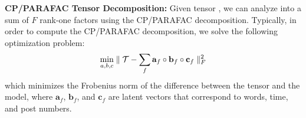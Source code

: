 

\textbf{CP/PARAFAC Tensor Decomposition:}
Given tensor \tensor, we can analyze into a sum of $F$ rank-one factors  using the CP/PARAFAC decomposition.
Typically, in order to compute the CP/PARAFAC decomposition, we solve the following optimization problem:
\[ \footnotesize
\min\limits_{a, b, c}  \parallel {\ensuremath{\mathbf{\mathcal{T}}}} - \sum\limits_{f}  \mathbf{a}_f \circ \mathbf{b}_f \circ \mathbf{c}_f   \parallel_{F}^{2}
\]
which minimizes the Frobenius norm of the difference between the tensor and the model, where $\mathbf{a}_f$, $\mathbf{b}_f$, and $\mathbf{c}_f$ are latent vectors that correspond to words, time, and post numbers.  


